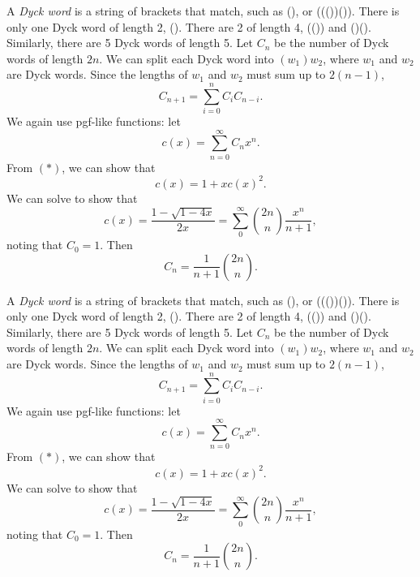 \begin{note}
  \begin{field}
    \begin{eg}
      A \emph{Dyck word} is a string of brackets that match, such as (), or ((())()).
      There is only one Dyck word of length 2, (). There are 2 of length 4, (()) and ()(). Similarly, there are 5 Dyck words of length 5.
      Let $C_n$ be the number of Dyck words of length $2n$. We can split each Dyck word into $(w_1)w_2$, where $w_1$ and $w_2$ are Dyck words. Since the lengths of $w_1$ and $w_2$ must sum up to $2(n -1)$,
      \[
        C_{n + 1} = \sum_{i = 0}^n C_iC_{n - i}.\tag{$*$}
      \]
      We again use pgf-like functions: let
      \[
        c(x) = \sum_{n = 0}^\infty C_n x^n.
      \]
      From $(*)$, we can show that
      \[
        c(x) = 1 + xc(x)^2.
      \]
      We can solve to show that
      \[
        c(x) = \frac{1 - \sqrt{1 - 4x}}{2x} = \sum_0^\infty \binom{2n}{n}\frac{x^n}{n + 1},
      \]
      noting that $C_0 = 1$. Then
      \[
        C_n = \frac{1}{n + 1}\binom{2n}{n}.
      \]
    \end{eg}
  \end{field}
  \begin{field}
    \begin{eg}
      A \emph{Dyck word} is a string of brackets that match, such as (), or ((())()).
      There is only one Dyck word of length 2, (). There are 2 of length 4, (()) and ()(). Similarly, there are 5 Dyck words of length 5.
      Let $C_n$ be the number of Dyck words of length $2n$. We can split each Dyck word into $(w_1)w_2$, where $w_1$ and $w_2$ are Dyck words. Since the lengths of $w_1$ and $w_2$ must sum up to $2(n -1)$,
      \[
        C_{n + 1} = \sum_{i = 0}^n C_iC_{n - i}.\tag{$*$}
      \]
      We again use pgf-like functions: let
      \[
        c(x) = \sum_{n = 0}^\infty C_n x^n.
      \]
      From $(*)$, we can show that
      \[
        c(x) = 1 + xc(x)^2.
      \]
      We can solve to show that
      \[
        c(x) = \frac{1 - \sqrt{1 - 4x}}{2x} = \sum_0^\infty \binom{2n}{n}\frac{x^n}{n + 1},
      \]
      noting that $C_0 = 1$. Then
      \[
        C_n = \frac{1}{n + 1}\binom{2n}{n}.
      \]
    \end{eg}
  \end{field}
  \xplain{}%
\end{note}

